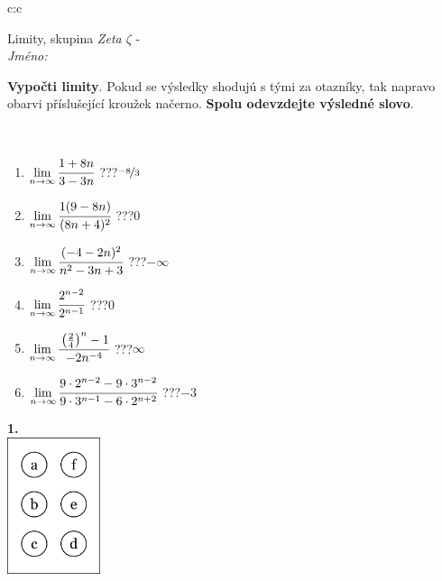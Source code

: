 \documentclass[10pt]{report}
\begin{document}
\begin{tabular}{c:c}
\begin{minipage}[c][104.5mm][t]{0.5\linewidth}
\begin{center}
\vspace{7mm}
{\huge Limity, skupina \textit{Zeta $\zeta$} -}\\[5mm]
\textit{Jméno:}\phantom{xxxxxxxxxxxxxxxxxxxxxxxxxxxxxxxxxxxxxxxxxxxxxxxxxxxxxxxxxxxxxxxxx}\\[5mm]
\begin{minipage}{0.95\linewidth}
\begin{center}
\textbf{Vypočti limity}. Pokud se výsledky shodujú s tými za otazníky, tak napravo\\obarvi příslušející kroužek načerno. \textbf{Spolu odevzdejte výsledné slovo}.
\end{center}
\end{minipage}
\\[1mm]
\begin{minipage}{0.79\linewidth}
\begin{center}
\begin{varwidth}{\linewidth}
\begin{enumerate}
\normalsize
\item $\lim\limits_{n\to\infty}\cfrac{1+8n}{3-3n}$\quad \dotfill\; ???\;\dotfill \quad $\nicefrac{-8}{3}$
\item $\lim\limits_{n\to\infty}\cfrac{1(9-8n)}{(8n+4)^2}$\quad \dotfill\; ???\;\dotfill \quad $0$
\item $\lim\limits_{n\to\infty}\cfrac{(-4-2n)^2}{n^2-3n+3}$\quad \dotfill\; ???\;\dotfill \quad $-\infty$
\item $\lim\limits_{n\to\infty}\cfrac{2^{n-2}}{2^{n-1}}$\quad \dotfill\; ???\;\dotfill \quad $0$
\item $\lim\limits_{n\to\infty}\cfrac{\left(\frac{2}{4}\right)^n -1}{-2n^{-4}}$\quad \dotfill\; ???\;\dotfill \quad $\infty$
\item $\lim\limits_{n\to\infty}\cfrac{9\cdot 2^{n-2}-9\cdot 3^{n-2}}{9\cdot 3^{n-1}-6\cdot 2^{n+2}}$\quad \dotfill\; ???\;\dotfill \quad $-3$
\end{enumerate}
\end{varwidth}
\end{center}
\end{minipage}
\begin{minipage}{0.20\linewidth}
\begin{center}
{\Huge\bfseries 1.} \\[2mm]
\includegraphics[height=40mm]{../images/braille.png}

\end{center}
\end{minipage}
\end{center}
\end{minipage}
\end{tabular}
\end{document}
